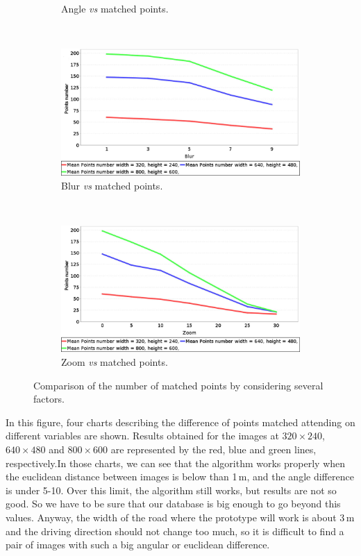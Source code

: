 \begin{figure}[h!]
\begin{subfigure}[b]{0.45\textwidth}
	  \caption{Angle \emph{vs} matched points.}\label{fig:cp02_angle_vs_matched}
        \end{subfigure}%
        \\
        \begin{subfigure}[b]{0.45\textwidth}
	    \includegraphics[width=\textwidth]{blurVsMatches}
	  \caption{Blur \emph{vs} matched points.}\label{fig:cp02_blur_vs_matched}
        \end{subfigure}%
        ~
        \begin{subfigure}[b]{0.45\textwidth}
	    \includegraphics[width=\textwidth]{zoomVsMatches}
	  \caption{Zoom \emph{vs} matched points.}\label{fig:cp02_zoom_vs_matched}
        \end{subfigure}%
        \caption{Comparison of the number of matched points by considering several factors.}\label{fig:cp02_matching_results}
\end{figure}

In this figure, four charts describing the difference of points matched attending on different variables are shown. Results obtained for the images at $320 \times 240$, $640 \times 480$ and $800 \times 600$ are represented by the red, blue and green lines, respectively.In those charts, we can see that the algorithm works properly when the euclidean distance between images is below than 1\,m, and the angle difference is under 5-10\textdegree. Over this limit, the algorithm still works, but results are not so good. So we have to be sure that our database is big enough to go beyond this values. Anyway, the width of the road where the prototype will work is about 3\,m and the driving direction should not change too much, so it is difficult to find a pair of images with such a big angular or euclidean difference.

